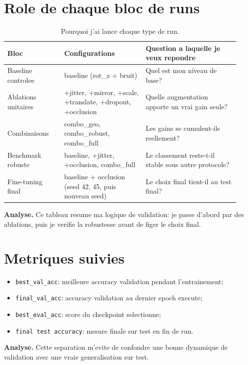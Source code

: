 \section{Role de chaque bloc de runs}
\begin{table}[H]
\centering
\caption{Pourquoi j'ai lance chaque type de run.}
\label{tab:runs-purpose}
\begin{tabular}{p{0.23\linewidth}p{0.33\linewidth}p{0.38\linewidth}}
\toprule
Bloc & Configurations & Question a laquelle je veux repondre \\
\midrule
Baseline controlee & baseline (rot\_z + bruit) & Quel est mon niveau de base? \\
Ablations unitaires & +jitter, +mirror, +scale, +translate, +dropout, +occlusion & Quelle augmentation apporte un vrai gain seule? \\
Combinaisons & combo\_geo, combo\_robust, combo\_full & Les gains se cumulent-ils reellement? \\
Benchmark robuste & baseline, +jitter, +occlusion, combo\_full & Le classement reste-t-il stable sous autre protocole? \\
Fine-tuning final & baseline + occlusion (seed 42, 45, puis nouveau seed) & Le choix final tient-il au test final? \\
\bottomrule
\end{tabular}
\end{table}

\noindent\textbf{Analyse.} Ce tableau resume ma logique de validation: je passe d'abord par des ablations, puis je verifie la robustesse avant de figer le choix final.

\section{Metriques suivies}
\begin{itemize}
  \item \texttt{best\_val\_acc}: meilleure accuracy validation pendant l'entrainement;
  \item \texttt{final\_val\_acc}: accuracy validation au dernier epoch execute;
  \item \texttt{best\_eval\_acc}: score du checkpoint selectionne;
  \item \texttt{final test accuracy}: mesure finale sur test en fin de run.
\end{itemize}

\noindent\textbf{Analyse.} Cette separation m'evite de confondre une bonne dynamique de validation avec une vraie generalisation sur test.
